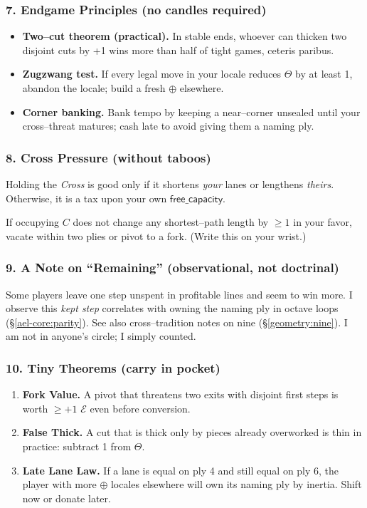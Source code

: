 \documentclass[11pt]{article}
\begin{document}
\begin{itemize}
\subsubsection{7. Endgame Principles (no candles required)}
\begin{itemize}\setlength\itemsep{0.25em}
  \item \textbf{Two–cut theorem (practical).} In stable ends, whoever can thicken two disjoint cuts by +1 wins more than half of tight games, ceteris paribus.
  \item \textbf{Zugzwang test.} If every legal move in your locale reduces \(\Theta\) by at least 1, abandon the locale; build a fresh \(\oplus\) elsewhere.
  \item \textbf{Corner banking.} Bank tempo by keeping a near–corner unsealed until your cross–threat matures; cash late to avoid giving them a naming ply.
\end{itemize}

\subsubsection{8. Cross Pressure (without taboos)}
\label{ael-core:cross}
Holding the \emph{Cross} is good only if it shortens \emph{your} lanes or lengthens \emph{theirs}. Otherwise, it is a tax upon your own \(\mathsf{free\_capacity}\).

\begin{lemma}
If occupying \(C\) does not change any shortest–path length by \(\ge 1\) in your favor, vacate within two plies or pivot to a fork. (Write this on your wrist.)
\end{lemma}

\subsubsection{9. A Note on “Remaining” (observational, not doctrinal)}
\label{ael-core:remaining}
Some players leave one step unspent in profitable lines and seem to win more. I observe this \emph{kept step} correlates with owning the naming ply in octave loops (\S\ref{ael-core:parity}). See also cross–tradition notes on nine (\S\ref{geometry:nine}). I am not in anyone’s circle; I simply counted.

\subsubsection{10. Tiny Theorems (carry in pocket)}
\begin{enumerate}\setlength\itemsep{0.25em}
  \item \textbf{Fork Value.} A pivot that threatens two exits with disjoint first steps is worth \(\ge +1\) \(\mathcal{E}\) even before conversion.
  \item \textbf{False Thick.} A cut that is thick only by pieces already overworked is thin in practice: subtract 1 from \(\Theta\).
  \item \textbf{Late Lane Law.} If a lane is equal on ply 4 and still equal on ply 6, the player with more \(\oplus\) locales elsewhere will own its naming ply by inertia. Shift now or donate later.
\end{enumerate}


\end{itemize}
\end{document}

